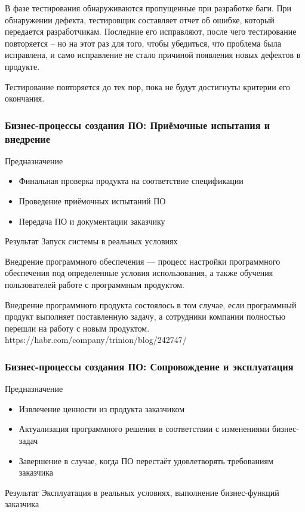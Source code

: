 \documentclass{../industrial-development}
\begin{document}
В фазе тестирования обнаруживаются пропущенные при разработке баги. При обнаружении дефекта, тестировщик составляет отчет об ошибке, который передается разработчикам. Последние его исправляют, после чего тестирование повторяется – но на этот раз для того, чтобы убедиться, что проблема была исправлена, и само исправление не стало причиной появления новых дефектов в продукте.

Тестирование повторяется до тех пор, пока не будут достигнуты критерии его окончания.

\begin{frame} \frametitle{Бизнес-процессы создания ПО: Приёмочные испытания и внедрение}
	\begin{block}{Предназначение}
		\begin{itemize}
			\item Финальная проверка продукта на соответствие спецификации
			\item Проведение приёмочных испытаний ПО
			\item Передача ПО и документации заказчику
		\end{itemize}
	\end{block}
	\begin{block}{Результат}
		Запуск системы в реальных условиях
	\end{block}
\end{frame}
\lecturenotes
	
Внедрение программного обеспечения — процесс настройки программного обеспечения под определенные условия использования, а также обучения пользователей работе с программным продуктом.

Внедрение программного продукта состоялось в том случае, если программный продукт выполняет поставленную задачу, а сотрудники компании полностью перешли на работу с новым продуктом.	
https://habr.com/company/trinion/blog/242747/

\begin{frame} \frametitle{Бизнес-процессы создания ПО: Сопровождение и эксплуатация}
	\begin{block}{Предназначение}
		\begin{itemize}
			\item Извлечение ценности из продукта заказчиком
			\item Актуализация программного решения в соответствии с изменениями бизнес-задач
			\item Завершение в случае, когда ПО перестаёт удовлетворять требованиям заказчика
		\end{itemize}
	\end{block}
	\begin{block}{Результат}
		Эксплуатация в реальных условиях, выполнение бизнес-функций заказчика
	\end{block}
\end{frame}
\lecturenotes
\end{document}
